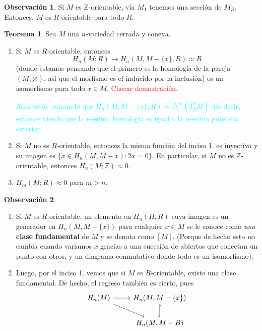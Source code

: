\documentclass[spanish]{book}
\theoremstyle{definition}
\newtheorem*{obs}{Observación}
\newtheorem*{teo}{Teorema}
\newcommand{\Z}{\mathbb{Z}}
\begin{document}
\begin{obs}
	Si $M$ es $\Z$-orientable, vía $M_1$ tenemos una sección de $M_R$. Entonces, $M$ es $R$-orientable para todo $R$.
\end{obs}

\begin{teo}
	Sea $M$ una $n$-variedad cerrada y conexa.
	\begin{enumerate}
		\item Si $M$ es $R$-orientable, entonces
		\[H_n(M;R)\to H_n(M,M-\{x\},R)\approx R\]
		(donde estamos pensando que el primero es la homología de la pareja $(M,\varnothing)$, así que el morfismo es el inducido por la inclusión) es un isomorfismo para todo $x\in M$. \textcolor{red}{Checar demostración.}
		
		\textcolor{cyan}{Aquí estoy pensando que $H_n(M,M-\{x\},R)\approx\bigwedge^n(T_p^*M)$. Es decir, estamos viendo que la $n$-ésima homología es igual a la $n$-ésima potencia exterior.}
		
		\item Si $M$ no es $R$-orientable, entonces la misma función del inciso 1. es inyectiva y su imagen es $\{x\in H_n(M,M-{x}):2x=0\}$. En particular, si $M$ no es $\Z$-orientable, entonces $H_n(M;\Z)\approx 0$.
		
		\item $H_m(M;R)\approx0$ para $m>n$.
	\end{enumerate}
\end{teo}

\begin{obs}\leavevmode
	\begin{enumerate}
	\item Si $M$ es $R$-orientable, un elemento en $H_n(H,R)$ cuya imagen es un generador en $H_n(M,M-\{x\})$ para cualquier $x\in M$ se le conoce como \textit{una} \textbf{clase fundamental} de $M$ y se denota como $[M]$. (Porque de hecho esto no cambia cuando variamos $x$ gracias a una sucesión de abiertos que conectan un punto con otros, y un diagrama conmutativo donde todo es un isomorfismo).

	\item Luego, por el inciso 1. vemos que si $M$ es $R$-orientable, existe una clase fundamental. De hecho, el regreso también es cierto, pues
	\[\begin{tikzcd}
		H_n(M)\arrow[r]\arrow[rd]&H_n(M,M-\{x\})\\
		&H_n(M,M-B)\arrow[u,hook]
	\end{tikzcd}\]
\end{enumerate}
\end{obs}
\end{document}
